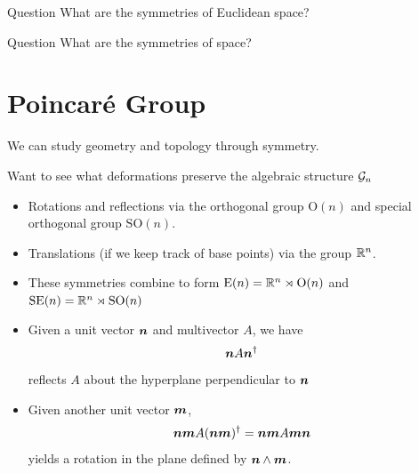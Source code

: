 \documentclass[aspectratio=169]{beamer}
\begin{document}
\begin{frame}{Question}
    \vfill
    \center
    What are the symmetries of Euclidean space?
    \vfill
\end{frame}

\begin{frame}{Question}
    \vfill
    \center
    What are the symmetries of  space?
    \vfill
\end{frame}


\section{Poincar\'e Group}

\begin{frame}{}
\vfill
\huge \centering We can study geometry and topology through symmetry.
\vfill
\end{frame}

\begin{frame}{}
\vfill
Want to see what deformations preserve the algebraic structure $\mathcal{G}_n$
\begin{itemize}
	\item Rotations and reflections via the orthogonal group $\mathrm{O}(n)$ and special orthogonal group $\mathrm{SO}(n)$.
	\item Translations (if we keep track of base points) via the group $\mathbb{R}^n$.
	\item These symmetries combine to form  $\mathrm{E}(n) = \mathbb{R}^n \rtimes \mathrm{O}(n)$ and  $\mathrm{SE}(n)=\mathbb{R}^n \rtimes \mathrm{SO}(n)$
\end{itemize}
\vfill
\end{frame}

\begin{frame}{}
\vfill
\begin{itemize}
	\item Given a unit vector $\boldsymbol{n}$ and multivector $A$, we have 
	\[
	\boldsymbol{n} A \boldsymbol{n}^\dagger
	\]
	 reflects $A$ about the hyperplane perpendicular to $\boldsymbol{n}$
	\item Given another unit vector $\boldsymbol{m}$, 
	\[
	\boldsymbol{nm}A(\boldsymbol{nm})^\dagger = \boldsymbol{nm}A \boldsymbol{mn}
	\]
	 yields a rotation in the plane defined by $\boldsymbol{n}\wedge \boldsymbol{m}$.
\end{itemize}
\vfill
\end{frame}
\end{document}
